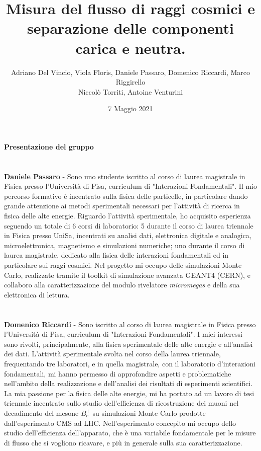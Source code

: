 \documentclass{article}
\title{\textbf{Misura del flusso di raggi cosmici e separazione delle componenti carica e neutra.}}
\author{Adriano Del Vincio, Viola Floris, Daniele Passaro, Domenico Riccardi, Marco Riggirello
\\
Niccolò Torriti, Antoine Venturini}
\date{7 Maggio 2021}
\begin{document}
\maketitle
\begin{center}
\textbf{\Large Presentazione del gruppo}
\end{center}

\section*{}
\textbf{Daniele Passaro} - Sono uno studente iscritto al corso di laurea magistrale in Fisica presso l'Università di Pisa, curriculum di  "Interazioni Fondamentali". 
Il mio percorso formativo è incentrato sulla fisica delle particelle, in particolare dando grande attenzione ai metodi sperimentali necessari per l'attività di ricerca in fisica delle alte energie. Riguardo l'attività sperimentale, ho acquisito esperienza seguendo un totale di 6 corsi di laboratorio: 5 durante il corso di laurea triennale in Fisica presso UniSa, incentrati su analisi dati, elettronica digitale e analogica, microelettronica, magnetismo e simulazioni numeriche; uno durante il corso di laurea magistrale, dedicato alla fisica delle interazioni fondamentali ed in particolare sui raggi cosmici.
Nel progetto mi occupo delle simulazioni Monte Carlo, realizzate tramite il toolkit di simulazione avanzata GEANT4 (\textcopyright CERN), e collaboro alla caratterizzazione del modulo rivelatore \emph{micromegas} e della sua elettronica di lettura. 

\section*{}
\textbf{Domenico Riccardi} - Sono iscritto al corso di laurea magistrale in Fisica presso l'Università di Pisa, curriculum di "Interazioni Fondamentali". I miei interessi sono rivolti, principalmente, alla fisica sperimentale delle alte energie e all'analisi dei dati. L'attività sperimentale svolta nel corso della laurea triennale, frequentando tre laboratori, e in quella magistrale, con il laboratorio d'interazioni fondamentali, mi hanno permesso di approfondire aspetti e problematiche nell'ambito della realizzazione e dell'analisi dei risultati di esperimenti scientifici. La mia passione per la fisica delle alte energie, mi ha portato ad un lavoro di tesi triennale incentrato sullo studio dell'efficienza di ricostruzione dei muoni nel decadimento del mesone $B_c^+$ su simulazioni Monte Carlo prodotte dall'esperimento CMS ad LHC. Nell'esperimento concepito mi occupo dello studio dell'efficienza dell'apparato, che è una variabile fondamentale per le misure di flusso che si vogliono ricavare, e più in generale sulla sua caratterizzazione.
\end{document}
